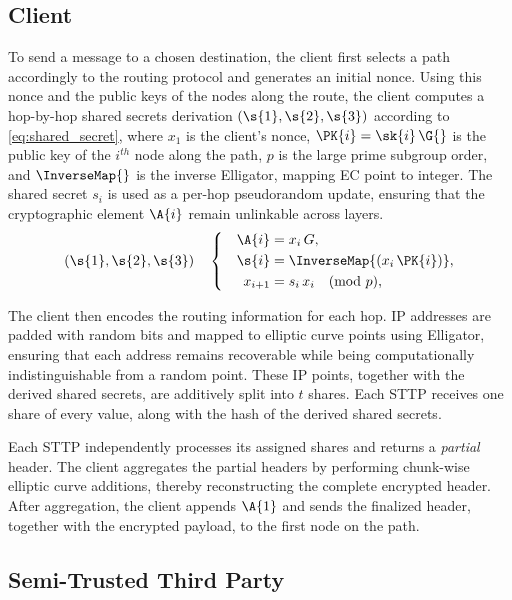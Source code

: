 \subsection{Client}

To send a message to a chosen destination, the client first selects a path accordingly to the routing protocol and generates an initial nonce.  
Using this nonce and the public keys of the nodes along the route, the client computes a hop-by-hop shared secrets derivation \((\s{1}, \s{2}, \s{3})\)
according to \eqref{eq:shared_secret}, where $x_1$ is the client's nonce, $\PK{i} = \sk{i}\,\G{}$ is the public key of the $i^{th}$ node along the path, 
$p$ is the large prime subgroup order, and $\InverseMap{}$ is the inverse Elligator, mapping EC point to integer.
The shared secret $s_i$ is used as a per-hop pseudorandom update, ensuring that the cryptographic element $\A{i}$ remain unlinkable across layers.
\begin{equation}
(\s{1}, \s{2}, \s{3}) \quad \left\{ \quad
\begin{aligned}
    \A{i}    &= x_i \, G, \\
    \s{i}    &= \InverseMap{(x_i \, \PK{i})}, \\
    x_{i+1}  &= s_i \, x_i \quad (\text{mod}\ p),
\end{aligned}
\right.
\label{eq:shared_secret}
\end{equation}

The client then encodes the routing information for each hop. 
IP addresses are padded with random bits and mapped to elliptic curve points using Elligator, 
ensuring that each address remains recoverable while being computationally indistinguishable from a random point. 
These IP points, together with the derived shared secrets, are additively split into $t$ shares. 
Each STTP receives one share of every value, along with the hash of the derived shared secrets.

Each STTP independently processes its assigned shares and returns a \emph{partial} header. 
The client aggregates the partial headers by performing chunk-wise elliptic curve additions, 
thereby reconstructing the complete encrypted header. 
After aggregation, the client appends $\A{1}$ and sends the finalized header, together with the encrypted payload, to the first node on the path.

\subsection{Semi-Trusted Third Party}

